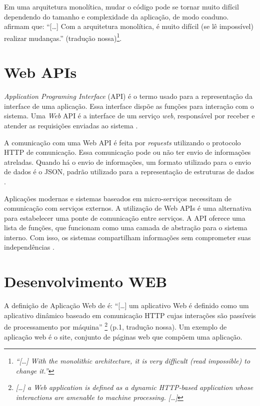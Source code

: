 Em uma arquitetura monolítica, mudar o código pode se tornar muito difícil dependendo do tamanho e complexidade da aplicação, de modo coaduno.  afirmam que: ``[\dots] Com a arquitetura monolítica, é muito difícil (se lê impossível) realizar mudanças.'' (tradução nossa)\footnote{\textit{``[\dots] With the monolithic architecture, it is very difficult (read impossible) to change it.''}}.

\section{Web APIs}
\label{sec:apis}

\textit{Application Programing Interface} (API) é o termo usado para a representação da interface de uma aplicação. Essa interface dispõe as funções para interação com o sistema. Uma \textit{Web} API é a interface de um serviço \textit{web}, responsável por receber e atender as requisições enviadas ao sistema \cite{masse2011rest, richardson2013restful}.

A comunicação com uma Web API é feita por \textit{requests} utilizando o protocolo HTTP de comunicação. Essa comunicação pode ou não ter envio de informações atreladas. Quando há o envio de informações, um formato utilizado para o envio de dados é o JSON, padrão utilizado para a representação de estruturas de dados \cite{richardson2013restful}.

Aplicações modernas e sistemas baseados em micro-serviços necessitam de comunicação com serviços externos. A utilização de Web APIs é uma alternativa para estabelecer uma ponte de comunicação entre serviços. A API oferece uma lista de funções, que funcionam como uma camada de abstração para o sistema interno. Com isso, os sistemas compartilham informações sem comprometer suas independências \cite{ghebremicael2017transformation}.

\section {Desenvolvimento WEB}
\label{sec:desenvolvimentoWEB}

A definição de Aplicação Web de  é:
``[\dots] um aplicativo Web é definido como um aplicativo dinâmico baseado em comunicação HTTP cujas interações são passíveis de processamento por máquina'' \footnote{\textit{[\dots] a Web application is defined as a dynamic HTTP-based application whose
interactions are amenable to machine processing. [\dots]}} (p.1, tradução nossa). Um exemplo de aplicação web é o site, conjunto de páginas web que compõem uma aplicação.

